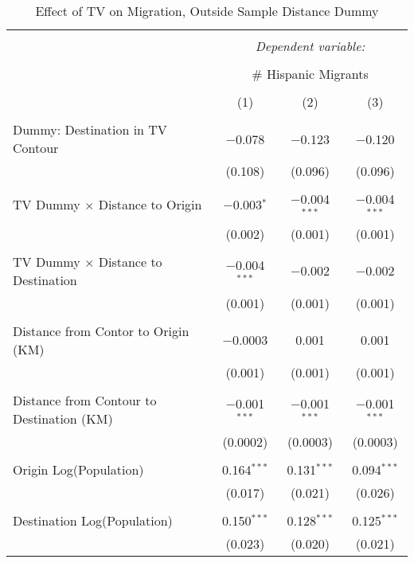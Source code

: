 
\begin{table}[!htbp] \centering 
  \caption{Effect of TV on Migration, Outside Sample Distance Dummy} 
  \label{} 
\begin{tabular}{@{\extracolsep{5pt}}lccc} 
\\[-1.8ex]\hline 
\hline \\[-1.8ex] 
 & \multicolumn{3}{c}{\textit{Dependent variable:}} \\ 
\cline{2-4} 
\\[-1.8ex] & \multicolumn{3}{c}{\# Hispanic Migrants} \\ 
\\[-1.8ex] & (1) & (2) & (3)\\ 
\hline \\[-1.8ex] 
 Dummy: Destination in TV Contour & $-$0.078 & $-$0.123 & $-$0.120 \\ 
  & (0.108) & (0.096) & (0.096) \\ 
  & & & \\ 
 TV Dummy $\times$ Distance to Origin & $-$0.003$^{*}$ & $-$0.004$^{***}$ & $-$0.004$^{***}$ \\ 
  & (0.002) & (0.001) & (0.001) \\ 
  & & & \\ 
 TV Dummy $\times$ Distance to Destination & $-$0.004$^{***}$ & $-$0.002 & $-$0.002 \\ 
  & (0.001) & (0.001) & (0.001) \\ 
  & & & \\ 
 Distance from Contor to Origin (KM) & $-$0.0003 & 0.001 & 0.001 \\ 
  & (0.001) & (0.001) & (0.001) \\ 
  & & & \\ 
 Distance from Contour to Destination (KM) & $-$0.001$^{***}$ & $-$0.001$^{***}$ & $-$0.001$^{***}$ \\ 
  & (0.0002) & (0.0003) & (0.0003) \\ 
  & & & \\ 
 Origin Log(Population) & 0.164$^{***}$ & 0.131$^{***}$ & 0.094$^{***}$ \\ 
  & (0.017) & (0.021) & (0.026) \\ 
  & & & \\ 
 Destination Log(Population) & 0.150$^{***}$ & 0.128$^{***}$ & 0.125$^{***}$ \\ 
  & (0.023) & (0.020) & (0.021) \\ 

\end{tabular}
\end{table}
